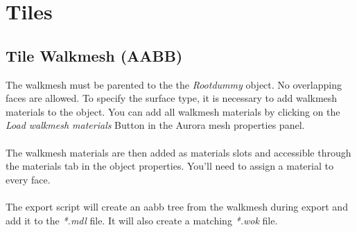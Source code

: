 \section{Tiles}

\subsection*{Tile Walkmesh (AABB)}
The walkmesh must be parented to the the {\textit{Rootdummy}} object.
No overlapping faces are allowed. To specify the surface type, it is necessary
to add walkmesh materials to the object. You can add all walkmesh
materials by clicking on the {\textit{Load walkmesh materials}} Button in the
Aurora mesh properties panel. \\ \\

The walkmesh materials are then added as materials slots and accessible
through the materials tab in the object properties. You'll need to assign
a material to every face. \\ \\

The export script will create an aabb tree from the walkmesh during export
and add it to the {\textit{*.mdl}} file. It will also create a
matching {\textit{*.wok}} file.

